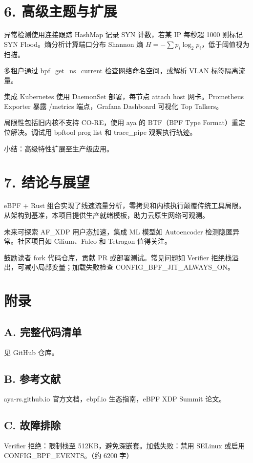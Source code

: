 \chapter{6. 高级主题与扩展}
异常检测使用连接跟踪 HashMap 记录 SYN 计数，若某 IP 每秒超 1000 则标记 SYN Flood。熵分析计算端口分布 Shannon 熵 $ H = -\sum p_i \log _2 p_i $，低于阈值视为扫描。\par
多租户通过 bpf\_{}get\_{}ns\_{}current 检查网络命名空间，或解析 VLAN 标签隔离流量。\par
集成 Kubernetes 使用 DaemonSet 部署，每节点 attach host 网卡。Prometheus Exporter 暴露 /metrics 端点，Grafana Dashboard 可视化 Top Talkers。\par
局限性包括旧内核不支持 CO-RE，使用 aya 的 BTF（BPF Type Format）重定位解决。调试用 bpftool prog list 和 trace\_{}pipe 观察执行轨迹。\par
小结：高级特性扩展至生产级应用。\par
\chapter{7. 结论与展望}
eBPF + Rust 组合实现了线速流量分析，零拷贝和内核执行颠覆传统工具局限。从架构到基准，本项目提供生产就绪模板，助力云原生网络可观测。\par
未来可探索 AF\_{}XDP 用户态加速，集成 ML 模型如 Autoencoder 检测隐匿异常。社区项目如 Cilium、Falco 和 Tetragon 值得关注。\par
鼓励读者 fork 代码仓库，贡献 PR 或部署测试。常见问题如 Verifier 拒绝栈溢出，可减小局部变量；加载失败检查 CONFIG\_{}BPF\_{}JIT\_{}ALWAYS\_{}ON。\par
\chapter{附录}
\section{A. 完整代码清单}
见 GitHub 仓库。\par
\section{B. 参考文献}
aya-rs.github.io 官方文档，ebpf.io 生态指南，eBPF XDP Summit 论文。\par
\section{C. 故障排除}
Verifier 拒绝：限制栈至 512KB，避免深嵌套。加载失败：禁用 SELinux 或启用 CONFIG\_{}BPF\_{}EVENTS。（约 6200 字）\par
